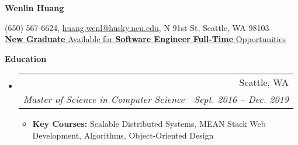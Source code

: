\documentclass{article}
\makeatletter
\newcommand{\resitem}[1]{
    \item #1
    \vspace{-2pt}
}
\newcommand{\resheading}[1]{{\large \colorbox{mygrey}{\begin{minipage}{\textwidth}{\textbf{#1 \vphantom{p\^{E}}}}\end{minipage}}}}
\newcommand{\ressubheading}[4]{
\begin{tabular*}{6.80in}{l@{\extracolsep{\fill}}r}
    \textbf{#1} & #2 \\
    \textit{#3} & \textit{#4} \\
\end{tabular*}\vspace{-6pt}}
\makeatother
\begin{document}

    \centering\textbf{\huge Wenlin Huang}\\ \vspace{0.1in}

    (650) 567-6624,
    \href {mailto:huang.wenl@husky.neu.edu} {huang.wenl@husky.neu.edu},
    {N 91st St, Seattle, WA 98103} \\

    {
        \underline{
            \textbf{New Graduate}
            Available for
            \textbf{Software Engineer}
            \textbf{Full-Time}
            Opportunities
        }
    }


    \resheading{Education}
    \begin{itemize}
        \item
        \ressubheading  %
        {\href
            {http://www.northeastern.edu}
            {Northeastern University}
        }
        {Seattle, WA}
        {Master of Science in Computer Science}
        {Sept. 2016 -- Dec. 2019}
        {\footnotesize
        \begin{itemize}
            \resitem
            {
            \textbf{Key Courses:} Scalable Distributed Systems, MEAN Stack Web Development,
            Algorithms, Object-Oriented Design
            }
        \end{itemize}
        }
    \end{itemize}
\end{document}
